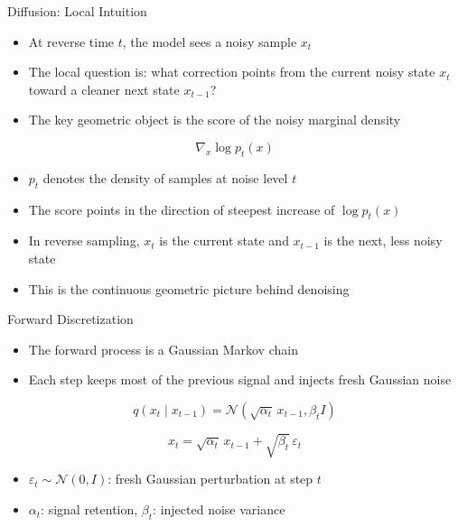 \documentclass[10pt,aspectratio=169]{ntuabeamer}
\begin{document}
\begin{frame}{Diffusion: Local Intuition}
  \begin{itemize}
    \item At reverse time \(t\), the model sees a noisy sample \(x_t\)
    \item The local question is: what correction points from the current noisy state \(x_t\) toward a cleaner next state \(x_{t-1}\)?
    \item The key geometric object is the score of the noisy marginal density
  \end{itemize}

  \[
    \nabla_x \log p_t(x)
  \]

  \begin{itemize}
    \item \(p_t\) denotes the density of samples at noise level \(t\)
    \item The score points in the direction of steepest increase of \(\log p_t(x)\)
    \item In reverse sampling, \(x_t\) is the current state and \(x_{t-1}\) is the next, less noisy state
    \item This is the continuous geometric picture behind denoising
  \end{itemize}
\end{frame}

\begin{frame}{Forward Discretization}
  \begin{itemize}
    \item The forward process is a Gaussian Markov chain
    \item Each step keeps most of the previous signal and injects fresh Gaussian noise
  \end{itemize}

  \[
    q(x_t \mid x_{t-1})
    =
    \mathcal N\!\left(\sqrt{\alpha_t}\,x_{t-1}, \beta_t I\right)
  \]

  \[
    x_t
    =
    \sqrt{\alpha_t}\,x_{t-1}
    +
    \sqrt{\beta_t}\,\varepsilon_t
  \]

  \begin{itemize}
    \item \(\varepsilon_t \sim \mathcal N(0,I)\): fresh Gaussian perturbation at step \(t\)
    \item \(\alpha_t\): signal retention, \(\beta_t\): injected noise variance
  \end{itemize}
\end{frame}
\end{document}
